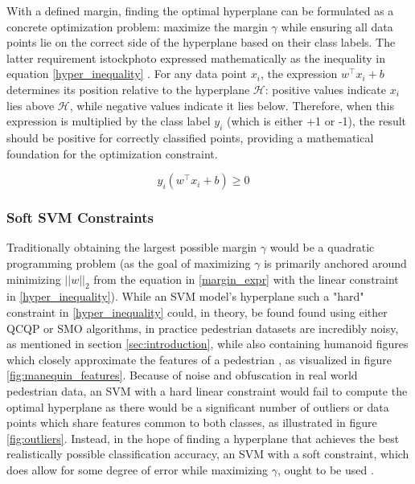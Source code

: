 With a defined margin, finding the optimal hyperplane can be formulated as a concrete optimization problem: maximize the margin $\gamma$ while ensuring all data points lie on the correct side of the hyperplane based on their class labels. The latter requirement istockphoto expressed mathematically as the inequality in equation \ref{hyper_inequality} \cite{ng_support}. For any data point $x_i$, the expression $w^\top x_i + b$ determines its position relative to the hyperplane $\mathcal{H}$: positive values indicate $x_i$ lies above $\mathcal{H}$, while negative values indicate it lies below. Therefore, when this expression is multiplied by the class label $y_i$ (which is either +1 or -1), the result should be positive for correctly classified points, providing a mathematical foundation for the optimization constraint.

\begin{equation}\label{hyper_inequality}
y_{i}(w^\top x_{i}+b)\ge 0 \quad 
\end{equation}

\subsubsection{Soft SVM Constraints}\label{sec:soft_constraint_svm}
Traditionally obtaining the largest possible margin $\gamma$ would be a quadratic programming problem \cite{quadratic_programming} (as the goal of maximizing $\gamma$ is primarily anchored around minimizing $||w||_{2}$ from the equation in \ref{margin_expr} with the linear constraint in \ref{hyper_inequality}). While an SVM model's hyperplane such a "hard" constraint in \ref{hyper_inequality} could, in theory, be found found using either QCQP \cite{cornell_svm_notes} or SMO \cite{chang_lin_2011_libsvm} algorithms, in practice pedestrian datasets are incredibly noisy, as mentioned in section \ref{sec:introduction}, while also containing humanoid figures which closely approximate the features of a pedestrian \cite{inria_improved}, as visualized in figure \ref{fig:manequin_features}. Because of noise and obfuscation in real world pedestrian data, an SVM with a hard linear constraint would fail to compute the optimal hyperplane as there would be a significant number of outliers or data points which share features common to both classes, as illustrated in figure \ref{fig:outliers}. Instead, in the hope of finding a hyperplane that achieves the best realistically possible classification accuracy, an SVM with a soft constraint, which does allow for some degree of error while maximizing $\gamma$, ought to be used \cite{dalal_2005_histograms} \cite{cornell_svm_continued}.

